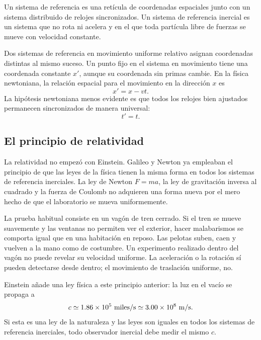 \begin{definition}
Un sistema de referencia es una retícula de coordenadas espaciales junto con un sistema distribuido de relojes sincronizados. Un sistema de referencia inercial es un sistema que no rota ni acelera y en el que toda partícula libre de fuerzas se mueve con velocidad constante.
\end{definition}

Dos sistemas de referencia en movimiento uniforme relativo asignan coordenadas distintas al mismo suceso. Un punto fijo en el sistema en movimiento tiene una coordenada constante \(x'\), aunque su coordenada sin primas cambie. En la física newtoniana, la relación espacial para el movimiento en la dirección \(x\) es
\begin{equation}
x'=x-vt.
\label{eq:sr1-galilean-space}
\end{equation}
La hipótesis newtoniana menos evidente es que todos los relojes bien ajustados permanecen sincronizados de manera universal:
\begin{equation}
t'=t.
\label{eq:sr1-absolute-time}
\end{equation}

\subsection{El principio de relatividad}

La relatividad no empezó con Einstein. Galileo y Newton ya empleaban el principio de que las leyes de la física tienen la misma forma en todos los sistemas de referencia inerciales. La ley de Newton \(F=ma\), la ley de gravitación inversa al cuadrado y la fuerza de Coulomb no adquieren una forma nueva por el mero hecho de que el laboratorio se mueva uniformemente.

La prueba habitual consiste en un vagón de tren cerrado. Si el tren se mueve suavemente y las ventanas no permiten ver el exterior, hacer malabarismos se comporta igual que en una habitación en reposo. Las pelotas suben, caen y vuelven a la mano como de costumbre. Un experimento realizado dentro del vagón no puede revelar su velocidad uniforme. La aceleración o la rotación sí pueden detectarse desde dentro; el movimiento de traslación uniforme, no.

Einstein añade una ley física a este principio anterior: la luz en el vacío se propaga a
\begin{equation}
c \simeq 1.86\times 10^5\ {\rm miles/s}
   \simeq 3.00\times 10^8\ {\rm m/s}.
\end{equation}
Si esta es una ley de la naturaleza y las leyes son iguales en todos los sistemas de referencia inerciales, todo observador inercial debe medir el mismo \(c\).

